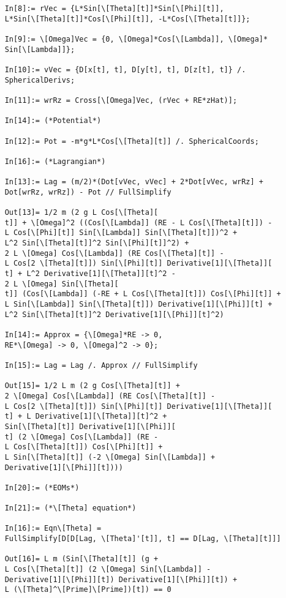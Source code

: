 \documentclass{article}
\theoremstyle{definition}
\begin{document}
\begin{enumerate}[label=(\alph*)]
\begin{lstlisting}
	In[8]:= rVec = {L*Sin[\[Theta][t]]*Sin[\[Phi][t]], 
	L*Sin[\[Theta][t]]*Cos[\[Phi][t]], -L*Cos[\[Theta][t]]};
	
	In[9]:= \[Omega]Vec = {0, \[Omega]*Cos[\[Lambda]], \[Omega]*
	Sin[\[Lambda]]};
	
	In[10]:= vVec = {D[x[t], t], D[y[t], t], D[z[t], t]} /. 
	SphericalDerivs;
	
	In[11]:= wrRz = Cross[\[Omega]Vec, (rVec + RE*zHat)];
	
	In[14]:= (*Potential*)
	
	In[12]:= Pot = -m*g*L*Cos[\[Theta][t]] /. SphericalCoords;
	
	In[16]:= (*Lagrangian*)
	
	In[13]:= Lag = (m/2)*(Dot[vVec, vVec] + 2*Dot[vVec, wrRz] + 
	Dot[wrRz, wrRz]) - Pot // FullSimplify
	
	Out[13]= 1/2 m (2 g L Cos[\[Theta][
	t]] + \[Omega]^2 ((Cos[\[Lambda]] (RE - L Cos[\[Theta][t]]) - 
	L Cos[\[Phi][t]] Sin[\[Lambda]] Sin[\[Theta][t]])^2 + 
	L^2 Sin[\[Theta][t]]^2 Sin[\[Phi][t]]^2) + 
	2 L \[Omega] Cos[\[Lambda]] (RE Cos[\[Theta][t]] - 
	L Cos[2 \[Theta][t]]) Sin[\[Phi][t]] Derivative[1][\[Theta]][
	t] + L^2 Derivative[1][\[Theta]][t]^2 - 
	2 L \[Omega] Sin[\[Theta][
	t]] (Cos[\[Lambda]] (-RE + L Cos[\[Theta][t]]) Cos[\[Phi][t]] + 
	L Sin[\[Lambda]] Sin[\[Theta][t]]) Derivative[1][\[Phi]][t] + 
	L^2 Sin[\[Theta][t]]^2 Derivative[1][\[Phi]][t]^2)
	
	In[14]:= Approx = {\[Omega]*RE -> 0, 
	RE*\[Omega] -> 0, \[Omega]^2 -> 0};
	
	In[15]:= Lag = Lag /. Approx // FullSimplify
	
	Out[15]= 1/2 L m (2 g Cos[\[Theta][t]] + 
	2 \[Omega] Cos[\[Lambda]] (RE Cos[\[Theta][t]] - 
	L Cos[2 \[Theta][t]]) Sin[\[Phi][t]] Derivative[1][\[Theta]][
	t] + L Derivative[1][\[Theta]][t]^2 + 
	Sin[\[Theta][t]] Derivative[1][\[Phi]][
	t] (2 \[Omega] Cos[\[Lambda]] (RE - 
	L Cos[\[Theta][t]]) Cos[\[Phi][t]] + 
	L Sin[\[Theta][t]] (-2 \[Omega] Sin[\[Lambda]] + 
	Derivative[1][\[Phi]][t])))
	
	In[20]:= (*EOMs*)
	
	In[21]:= (*\[Theta] equation*)
	
	In[16]:= Eqn\[Theta] = 
	FullSimplify[D[D[Lag, \[Theta]'[t]], t] == D[Lag, \[Theta][t]]]
	
	Out[16]= L m (Sin[\[Theta][t]] (g + 
	L Cos[\[Theta][t]] (2 \[Omega] Sin[\[Lambda]] - 
	Derivative[1][\[Phi]][t]) Derivative[1][\[Phi]][t]) + 
	L (\[Theta]^\[Prime]\[Prime])[t]) == 0
	

\end{lstlisting}
\end{enumerate}
\end{document}

